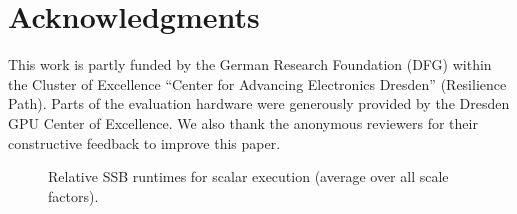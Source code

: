 \documentclass[format=sigconf,natbib=false]{acmart}
\providecommand\={}
\renewcommand{\=}[1][]{\hyp{}#1}
\begin{document}
\section*{Acknowledgments}
This work is partly funded by the German Research Foundation (DFG) within the Cluster of Excellence “Center for Advancing Electronics Dresden” (Resilience Path). Parts of the evaluation hardware were generously provided by the Dresden GPU Center of Excellence. We also thank the anonymous reviewers for their constructive feedback to improve this paper.


\clearpage

\begin{figure*}[t!]%
	\centering
	\footnotesize
	\graphicspath{{results/ssb/report/}}
	\begin{subfigure}[t]{6.5in}
		
	\end{subfigure}
	\vspace{-0.3cm}
	\caption{Relative SSB runtimes for scalar execution (average over all scale factors).}%
	\label{fig:eval:runtime:scalar}%
	\vspace{-0.4cm}
\end{figure*}

\printbibliography

\appendix


%
%

\end{document}
